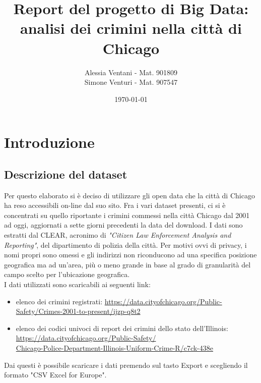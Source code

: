 \documentclass[10pt]{article}
\title{\textbf{Report del progetto di Big Data: \\ analisi dei crimini nella città di Chicago}}
\author{
	Alessia Ventani - Mat. 901809\\
	Simone Venturi - Mat. 907547}
\date{\today}
\begin{document}
\maketitle
\newpage

\tableofcontents

\newpage
\section{Introduzione}
\subsection{Descrizione del dataset}
Per questo elaborato si è deciso di utilizzare gli open data che la città di Chicago ha reso accessibili on-line dal suo sito. 
Fra i vari dataset presenti, ci si è concentrati su quello riportante i crimini commessi nella città Chicago dal 2001 ad oggi, aggiornati 
a sette giorni precedenti la data del download. I dati sono estratti dal CLEAR, acronimo di \textit{"Citizen Law Enforcement Analysis and Reporting"}, del dipartimento di polizia della città. Per motivi ovvi di privacy, i nomi propri sono omessi e gli indirizzi non riconducono 
ad una specifica posizione geografica ma ad un'area, più o meno grande in base al grado di granularità del campo scelto per l'ubicazione geografica. \\
I dati utilizzati sono scaricabili ai seguenti link:
\begin{itemize}
\item elenco dei crimini registrati: \url{https://data.cityofchicago.org/Public-Safety/Crimes-2001-to-present/ijzp-q8t2}
\item elenco dei codici univoci di report dei crimini dello stato dell'Illinois: \\ \url{https://data.cityofchicago.org/Public-Safety/}\\ \url{
 Chicago-Police-Department-Illinois-Uniform-Crime-R/c7ck-438e} 
\end{itemize}
Dai questi è possibile scaricare i dati premendo sul tasto Export e scegliendo il formato "CSV Excel for Europe".
 
\end{document}

